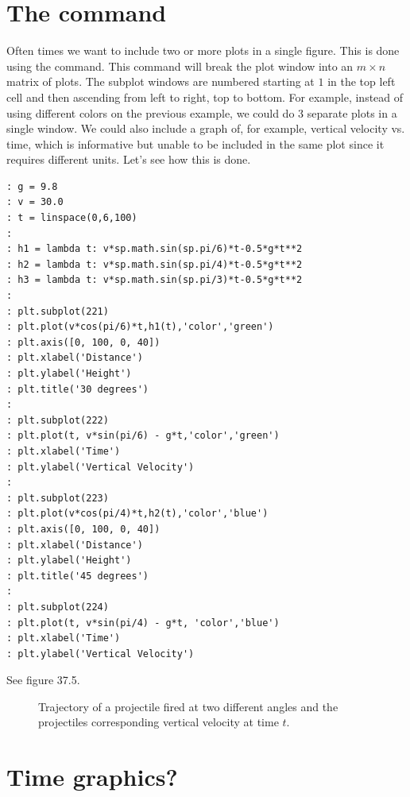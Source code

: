 \begin{problem} 
\end{problem}

\section{The  command}  
Often times we want to include two or more plots in a single figure.  This is done using the  command.  This command will break the plot window into an $m\times n$ matrix of plots.  The subplot windows are numbered starting at $1$ in the top left cell and then ascending from left to right, top to bottom.  For example, instead of using different colors on the previous example, we could do 3 separate plots in a single window.  We could also include a graph of, for example, vertical velocity vs. time, which is informative but unable to be included in the same plot since it requires different units.  Let's see how this is done.

\begin{lstlisting}[style=python]
: g = 9.8
: v = 30.0
: t = linspace(0,6,100)
:
: h1 = lambda t: v*sp.math.sin(sp.pi/6)*t-0.5*g*t**2
: h2 = lambda t: v*sp.math.sin(sp.pi/4)*t-0.5*g*t**2
: h3 = lambda t: v*sp.math.sin(sp.pi/3)*t-0.5*g*t**2
:
: plt.subplot(221)
: plt.plot(v*cos(pi/6)*t,h1(t),'color','green')
: plt.axis([0, 100, 0, 40])
: plt.xlabel('Distance')
: plt.ylabel('Height')
: plt.title('30 degrees')
:
: plt.subplot(222)
: plt.plot(t, v*sin(pi/6) - g*t,'color','green')
: plt.xlabel('Time')
: plt.ylabel('Vertical Velocity')
:
: plt.subplot(223)
: plt.plot(v*cos(pi/4)*t,h2(t),'color','blue')
: plt.axis([0, 100, 0, 40])
: plt.xlabel('Distance')
: plt.ylabel('Height')
: plt.title('45 degrees')
:
: plt.subplot(224)
: plt.plot(t, v*sin(pi/4) - g*t, 'color','blue')
: plt.xlabel('Time')
: plt.ylabel('Vertical Velocity')
\end{lstlisting}

See figure 37.5.

\begin{figure}
\begin{center}
\caption{Trajectory of a projectile fired at two different angles and the projectiles corresponding vertical velocity at time $t$.}
\end{center}
\end{figure}

\section{Time graphics?}



